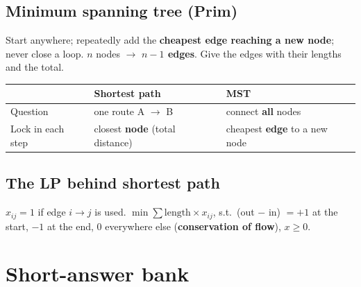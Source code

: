 \documentclass[10pt,a4paper]{article}
\newcommand{\thead}[1]{\textbf{#1}}
\begin{document}
\subsection{Minimum spanning tree (Prim)}

Start anywhere; repeatedly add the \textbf{cheapest edge reaching a new node}; never close a loop. $n$ nodes $\to$ \textbf{$n-1$ edges}. Give the edges with their lengths and the total.

\begin{tabularx}{\linewidth}{@{}l L L@{}}
\toprule
 & \thead{Shortest path} & \thead{MST} \\
\midrule
Question & one route A $\to$ B & connect \textbf{all} nodes \\
Lock in each step & closest \textbf{node} (total distance) & cheapest \textbf{edge} to a new node \\
\bottomrule
\end{tabularx}

\subsection{The LP behind shortest path}

$x_{ij} = 1$ if edge $i \to j$ is used. $\min \sum \text{length} \times x_{ij}$, s.t.\ (out $-$ in) $= +1$ at the start, $-1$ at the end, $0$ everywhere else (\textbf{conservation of flow}), $x \geq 0$.

\section{Short-answer bank}
\end{document}
